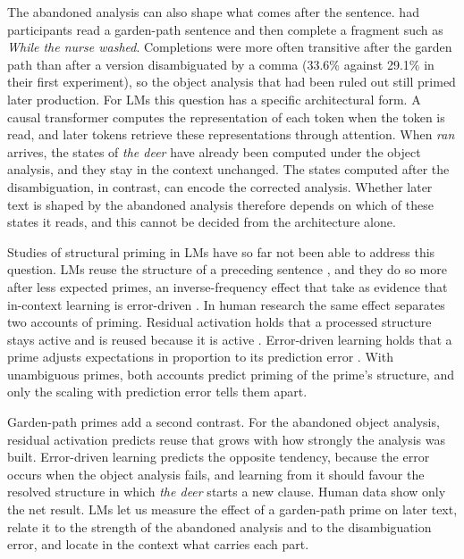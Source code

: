 \documentclass[11pt]{article}
\newcommand{\ex}[1]{\textit{#1}}
\begin{document}
The abandoned analysis can also shape what comes after the sentence.
\citet{vangompel2006} had participants read a garden-path sentence and then complete a fragment such as \ex{While the nurse washed}.
Completions were more often transitive after the garden path than after a version disambiguated by a comma (33.6\% against 29.1\% in their first experiment), so the object analysis that had been ruled out still primed later production.
For LMs this question has a specific architectural form.
A causal transformer computes the representation of each token when the token is read, and later tokens retrieve these representations through attention.
When \ex{ran} arrives, the states of \ex{the deer} have already been computed under the object analysis, and they stay in the context unchanged.
The states computed after the disambiguation, in contrast, can encode the corrected analysis.
Whether later text is shaped by the abandoned analysis therefore depends on which of these states it reads, and this cannot be decided from the architecture alone.

Studies of structural priming in LMs have so far not been able to address this question.
LMs reuse the structure of a preceding sentence \citep{sinclair2022,prasad2019,michaelov2023,pucci2026}, and they do so more after less expected primes, an inverse-frequency effect that \citet{zhou2025icl} take as evidence that in-context learning is error-driven \citep[see also][]{jumelet2024}.
In human research the same effect separates two accounts of priming.
Residual activation holds that a processed structure stays active and is reused because it is active \citep{pickering1998}.
Error-driven learning holds that a prime adjusts expectations in proportion to its prediction error \citep{chang2006,jaeger2013}.
With unambiguous primes, both accounts predict priming of the prime's structure, and only the scaling with prediction error tells them apart.

Garden-path primes add a second contrast.
For the abandoned object analysis, residual activation predicts reuse that grows with how strongly the analysis was built.
Error-driven learning predicts the opposite tendency, because the error occurs when the object analysis fails, and learning from it should favour the resolved structure in which \ex{the deer} starts a new clause.
Human data show only the net result.
LMs let us measure the effect of a garden-path prime on later text, relate it to the strength of the abandoned analysis and to the disambiguation error, and locate in the context what carries each part.
\end{document}
